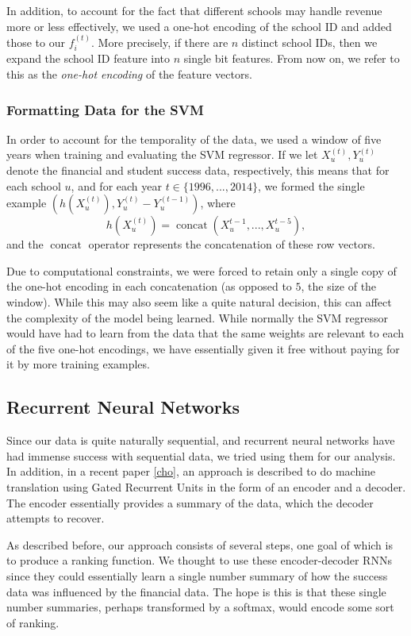 \documentclass[paper.tex]{subfiles}
\begin{document}
In addition, to account for the fact that different schools may handle revenue more or less effectively, we used a one-hot encoding of the school ID and added those to our $f_i^{(t)}$. More precisely, if there are $n$ distinct school IDs, then we expand the school ID feature into $n$ single bit features. From now on, we refer to this as the \emph{one-hot encoding} of the feature vectors. 
\subsubsection{Formatting Data for the SVM}
In order to account for the temporality of the data, we used a window of five years when training and evaluating the SVM regressor. If we let $X_u^{(t)}, Y_u^{(t)}$ denote the financial and student success data, respectively, this means that for each school $u$, and for each year $t \in \{1996, ..., 2014\}$, we formed the single example $(h(X_u^{(t)}), Y_u^{(t)} - Y_u^{(t - 1)})$, where \[ h(X_u^{(t)}) = \operatorname{concat}(X_u^{t - 1}, ..., X_u^{t - 5}), \] and the $\operatorname{concat}$ operator represents the concatenation of these row vectors. 

Due to computational constraints, we were forced to retain only a single copy of the one-hot encoding in each concatenation (as opposed to $5$, the size of the window). While this may also seem like a quite natural decision, this can affect the complexity of the model being learned. While normally the SVM regressor would have had to learn from the data that the same weights are relevant to each of the five one-hot encodings, we have essentially given it free without paying for it by more training examples. 


\subsection{Recurrent Neural Networks} Since our data is quite naturally sequential, and recurrent neural networks have had immense success with sequential data, we tried using them for our analysis. In addition, in a recent paper \ref{cho}, an approach is described to do machine translation using Gated Recurrent Units in the form of an encoder and a decoder. The encoder essentially provides a summary of the data, which the decoder attempts to recover.

As described before, our approach consists of several steps, one goal of which is to produce a ranking function. We thought to use these encoder-decoder RNNs since they could essentially learn a single number summary of how the success data was influenced by the financial data. The hope is this is that these single number summaries, perhaps transformed by a softmax, would encode some sort of ranking.  
\end{document}
